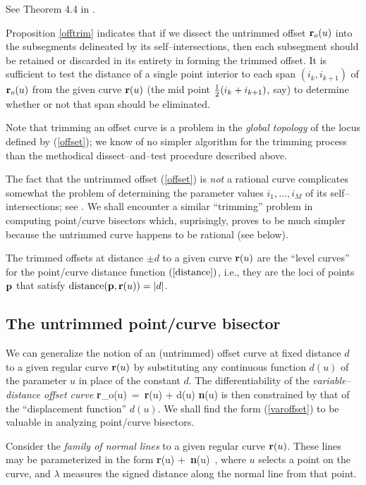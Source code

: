 \prf See Theorem 4.4 in \cite{farouki90a}. \QED

Proposition \ref{offtrim} indicates that if we dissect the
untrimmed offset ${\bf r}_o(u)$ into the subsegments delineated by
its self--intersections, then each subsegment should be retained
or discarded in its entirety in forming the trimmed offset. It is
sufficient to test the distance of a single point interior to each
span $(i_k,i_{k+1})$ of ${\bf r}_o(u)$ from the given curve ${\bf r}
(u)$ (the mid point $\textstyle{1 \over 2}\displaystyle(i_k+i_{k+1})$, say) to determine whether
or not that span should be eliminated.

Note that trimming an offset curve is a problem in the {\it global
topology\/} of the locus defined by (\ref{offset}); we know of no
simpler algorithm for the trimming process than the methodical
dissect--and--test procedure described above.

The fact that the untrimmed offset (\ref{offset}) is {\it not\/} a
rational curve complicates somewhat the problem of determining the
parameter values ${i_1,\ldots,i_M}$ of its self--intersections; see
\cite{farouki90b}. We shall encounter a similar ``trimming'' problem
in computing point/curve bisectors which, suprisingly, proves to be
much simpler because the untrimmed curve happens to be rational (see
below).

\begin{rmk}
{\rm
The trimmed offsets at distance $\pm d$ to a given curve ${\bf r}(u)$
are the ``level curves'' for the point/curve distance function $(\ref
{distance})$, i.e., they are the loci of points ${\bf p}$ that satisfy
${\rm distance}({\bf p},{\bf r}(u))=|d|$.
}
\end{rmk}

\subsection{The untrimmed point/curve bisector}

We can generalize the notion of an (untrimmed) offset curve at fixed
distance $d$ to a given regular curve ${\bf r}(u)$ by substituting
any continuous function $d(u)$ of the parameter $u$ in place of the
constant $d$. The differentiability of the {\it variable--distance
offset curve}
\be \label{varoffset}
{\bf r}_o(u) \,=\, {\bf r}(u) + d(u) {\bf n}(u)
\ee
is then constrained by that of the ``displacement function'' $d(u)$.
We shall find the form (\ref{varoffset}) to be valuable in analyzing
point/curve bisectors.

Consider the {\it family of normal lines\/} to a given regular curve
${\bf r}(u)$. These lines may be parameterized in the form
\be \label{nline}
{\bf r}(u) + \lambda\,{\bf n}(u) \,,
\ee
where $u$ selects a point on the curve, and $\lambda$ measures the
signed distance along the normal line from that point.

